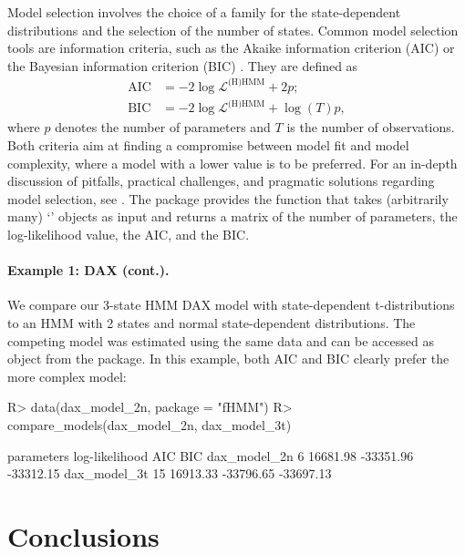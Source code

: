 \documentclass[article]{jss}
\newcommand{\class}[1]{`\code{#1}'}
\newcommand{\fct}[1]{\code{#1()}}
\begin{document}
Model selection involves the choice of a family for the state-dependent distributions and the selection of the number of states. Common model selection tools are information criteria, such as the Akaike information criterion (AIC) \citep{aka74} or the Bayesian information criterion (BIC) \citep{sch78}. They are defined as
\begin{align*}
\text{AIC} &= - 2 \log \mathcal{L}^\text{(H)HMM} + 2 p; \\
\text{BIC} &= - 2 \log \mathcal{L}^\text{(H)HMM} + \log(T) p,
\end{align*}
where $p$ denotes the number of parameters and $T$ is the number of observations. Both criteria aim at finding a compromise between model fit and model complexity, where a model with a lower value is to be preferred. For an in-depth discussion of pitfalls, practical challenges, and pragmatic solutions regarding model selection, see \cite{poh17}. The  package provides the \fct{compare\_models} function that takes (arbitrarily many) \class{fHMM\_model} objects as input and returns a matrix of the number of parameters, the log-likelihood value, the AIC, and the BIC. 

\paragraph{Example 1: DAX (cont.).} We compare our 3-state HMM DAX model with state-dependent t-distributions to an HMM with 2 states and normal state-dependent distributions. The competing model was estimated using the same data and can be accessed as object  from the package. In this example, both AIC and BIC clearly prefer the more complex model:

%
\begin{Schunk}
\begin{Sinput}
R> data(dax_model_2n, package = "fHMM")
R> compare_models(dax_model_2n, dax_model_3t)
\end{Sinput}
\begin{Soutput}
             parameters log-likelihood       AIC       BIC
dax_model_2n          6       16681.98 -33351.96 -33312.15
dax_model_3t         15       16913.33 -33796.65 -33697.13
\end{Soutput}
\end{Schunk}
%


\section{Conclusions} \label{sec:conclusion} %
\end{document}
